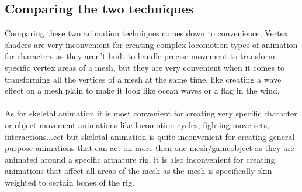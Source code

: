 \documentclass{scrartcl}
\begin{document}
\subsection{Comparing the two techniques}
Comparing these two animation techniques comes down to convenience, Vertex shaders are very inconvenient for creating complex locomotion types of animation for characters as they aren't built to handle precise movement to transform specific vertex areas of a mesh, but they are very convenient when it comes to transforming all the vertices of a mesh at the same time, like creating a wave effect on a mesh plain to make it look like ocean waves or a flag in the wind.
\\~\\
As for skeletal animation it is most convenient for creating very specific character or object movement animations like locomotion cycles, fighting move sets, interactions...ect but skeletal animation is quite inconvenient for creating general purpose animations that can act on more than one mesh/gameobject as they are animated around a specific armature rig, it is also inconvenient for creating animations that affect all areas of the mesh as the mesh is specifically skin weighted to certain bones of the rig.

\end{document}
